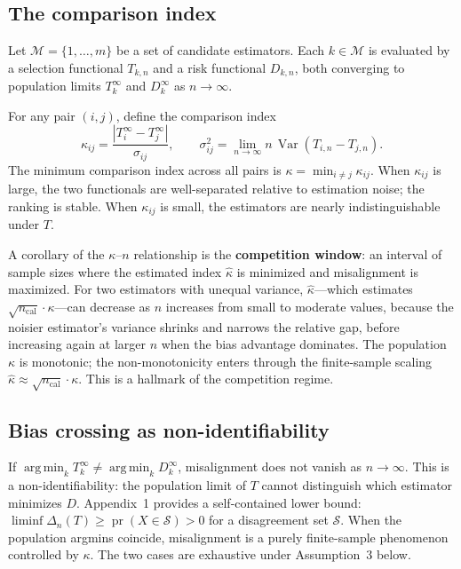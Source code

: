 \documentclass[lineno]{biometrika}
\DeclareMathOperator{\Var}{Var}
\DeclareMathOperator{\argmin}{arg\,min}
\DeclareMathOperator{\pr}{pr}
\begin{document}
\subsection{The comparison index}

Let $\mathcal{M} = \{1,\dots,m\}$ be a set of candidate estimators. Each $k\in\mathcal{M}$ is evaluated by a selection functional $T_{k,n}$ and a risk functional $D_{k,n}$, both converging to population limits $T_k^\infty$ and $D_k^\infty$ as $n\to\infty$.

For any pair $(i,j)$, define the comparison index
\begin{equation}
\kappa_{ij} = \frac{|T_i^\infty - T_j^\infty|}{\sigma_{ij}},\qquad
\sigma_{ij}^2 = \lim_{n\to\infty} n \,\Var(T_{i,n} - T_{j,n}).
\end{equation}
The minimum comparison index across all pairs is $\kappa = \min_{i\neq j}\kappa_{ij}$. When $\kappa_{ij}$ is large, the two functionals are well-separated relative to estimation noise; the ranking is stable. When $\kappa_{ij}$ is small, the estimators are nearly indistinguishable under $T$.

A corollary of the $\kappa$--$n$ relationship is the \textbf{competition window}: an interval of sample sizes where the estimated index $\hat\kappa$ is minimized and misalignment is maximized. For two estimators with unequal variance, $\hat\kappa$---which estimates $\sqrt{n_{\text{cal}}}\cdot\kappa$---can decrease as $n$ increases from small to moderate values, because the noisier estimator's variance shrinks and narrows the relative gap, before increasing again at larger $n$ when the bias advantage dominates. The population $\kappa$ is monotonic; the non-monotonicity enters through the finite-sample scaling $\hat\kappa \approx \sqrt{n_{\text{cal}}}\cdot\kappa$. This is a hallmark of the competition regime.

\subsection{Bias crossing as non-identifiability}

If $\argmin_k T_k^\infty \neq \argmin_k D_k^\infty$, misalignment does not vanish as $n\to\infty$. This is a non-identifiability: the population limit of $T$ cannot distinguish which estimator minimizes $D$. Appendix~1 provides a self-contained lower bound: $\liminf\Delta_n(T) \geq \pr(X \in \mathcal{S}) > 0$ for a disagreement set $\mathcal{S}$. When the population argmins coincide, misalignment is a purely finite-sample phenomenon controlled by $\kappa$. The two cases are exhaustive under Assumption~3 below.
\end{document}
